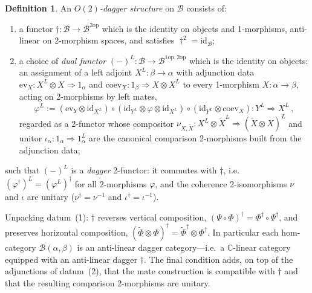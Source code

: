 \documentclass[11pt]{article}
\theoremstyle{definition}
\newtheorem{definition}[theorem]{Definition}
\newcommand{\cB}{\mathcal{B}}
\newcommand{\bC}{\mathbb{C}}
\newcommand{\op}{\mathrm{op}}
\newcommand{\Or}{O} %
\newcommand{\dg}{\dagger}
\begin{document}
\begin{definition}
\label{def:strictO2}
An \emph{$\Or(2)$-dagger structure} on $\cB$ consists of:
\begin{enumerate}
  \item a functor $\dg \colon \cB \to \cB^{2\op}$ which is the identity on objects and 1-morphisms, anti-linear on 2-morphism spaces, and satisfies $\dg^2 = \mathrm{id}_\cB$;
  \item a choice of \emph{dual functor} $(-)^L \colon \cB \to \cB^{1\op,2\op}$ which is the identity on objects: an assignment of a left adjoint $X^L \colon \beta \to \alpha$ with adjunction data $\mathrm{ev}_X \colon X^L \otimes X \Rightarrow 1_\alpha$ and $\mathrm{coev}_X \colon 1_\beta \Rightarrow X \otimes X^L$ to every 1-morphism $X \colon \alpha \to \beta$, acting on 2-morphisms by left mates,
  \begin{equation}
    \varphi^L := (\mathrm{ev}_Y \otimes \mathrm{id}_{X^L}) \circ (\mathrm{id}_{Y^L} \otimes \varphi \otimes \mathrm{id}_{X^L}) \circ (\mathrm{id}_{Y^L} \otimes \mathrm{coev}_X) \colon Y^L \Rightarrow X^L \, ,
  \end{equation}
  regarded as a 2-functor whose compositor $\nu_{X,\widetilde{X}} \colon X^L \otimes \widetilde{X}^L \Rightarrow (\widetilde{X} \otimes X)^L$ and unitor $\iota_\alpha \colon 1_\alpha \Rightarrow 1_\alpha^L$ are the canonical comparison 2-morphisms built from the adjunction data;
\end{enumerate}
such that $(-)^L$ is a \emph{dagger} 2-functor: it commutes with $\dg$, i.e.\ $(\varphi^\dg)^L = (\varphi^L)^\dg$ for all 2-morphisms $\varphi$, and the coherence 2-isomorphisms $\nu$ and $\iota$ are unitary ($\nu^\dagger=\nu^{-1}$ and $\iota^\dagger=\iota^{-1}$).
\end{definition}

Unpacking datum~(1): $\dg$ reverses vertical composition, $(\Psi \circ \Phi)^\dg = \Phi^\dg \circ \Psi^\dg$, and preserves horizontal composition, $(\widetilde{\Phi} \otimes \Phi)^\dg = \widetilde{\Phi}^\dg \otimes \Phi^\dg$. In particular each hom-category $\cB(\alpha, \beta)$ is an anti-linear dagger category---i.e.\ a $\bC$-linear category equipped with an anti-linear dagger $\dg$. The final condition adds, on top of the adjunctions of datum~(2), that the mate construction is compatible with $\dg$ and that the resulting comparison 2-morphisms are unitary.
\end{document}
